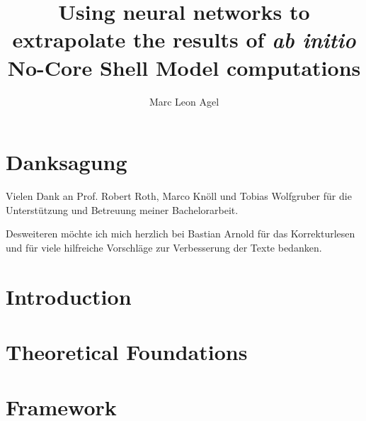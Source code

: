 






\title{Using neural networks to extrapolate the results of
  \textit{ab initio} No-Core Shell Model computations}
\author{Marc Leon Agel}


\submissiondate{\today}
\examdate{\today}

\maketitle

\affidavit

\chapter*{Danksagung}
Vielen Dank an Prof. Robert Roth, Marco Knöll und Tobias Wolfgruber für die Unterstützung und Betreuung meiner Bachelorarbeit.

Desweiteren möchte ich mich herzlich bei Bastian Arnold für das Korrekturlesen und für viele hilfreiche Vorschläge zur Verbesserung der Texte bedanken.

\tableofcontents

\chapter{Introduction}
\label{chap:introduction}


\chapter{Theoretical Foundations}
\label{chap:foundations}



\chapter{Framework}
\label{chap:framework}


